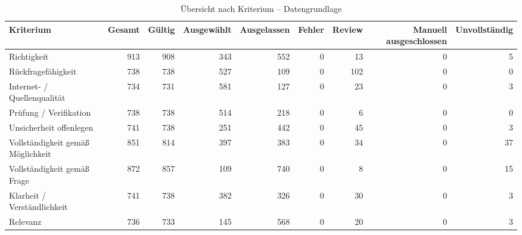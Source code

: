 \begin{table}[htbp]
\centering
\caption{Übersicht nach Kriterium -- Datengrundlage}
\begin{tabular}{lrrrrrrrr}
\toprule
Kriterium & Gesamt & Gültig & Ausgewählt & Ausgelassen & Fehler & Review & Manuell ausgeschlossen & Unvollständig \\
\midrule
Richtigkeit & 913 & 908 & 343 & 552 & 0 & 13 & 0 & 5 \\
Rückfragefähigkeit & 738 & 738 & 527 & 109 & 0 & 102 & 0 & 0 \\
Internet- / Quellenqualität & 734 & 731 & 581 & 127 & 0 & 23 & 0 & 3 \\
Prüfung / Verifikation & 738 & 738 & 514 & 218 & 0 & 6 & 0 & 0 \\
Unsicherheit offenlegen & 741 & 738 & 251 & 442 & 0 & 45 & 0 & 3 \\
Vollständigkeit gemäß Möglichkeit & 851 & 814 & 397 & 383 & 0 & 34 & 0 & 37 \\
Vollständigkeit gemäß Frage & 872 & 857 & 109 & 740 & 0 & 8 & 0 & 15 \\
Klarheit / Verständlichkeit & 741 & 738 & 382 & 326 & 0 & 30 & 0 & 3 \\
Relevanz & 736 & 733 & 145 & 568 & 0 & 20 & 0 & 3 \\
\bottomrule
\end{tabular}
\end{table}
